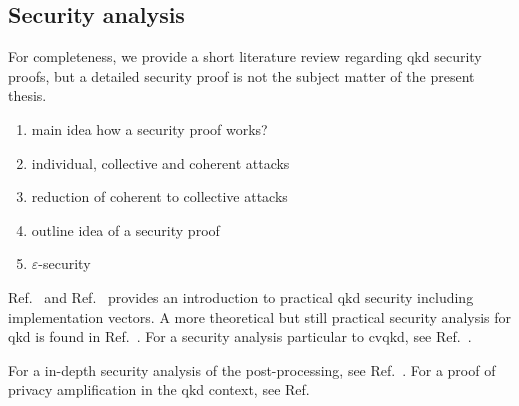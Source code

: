 \FloatBarrier
\subsection{Security analysis}

For completeness, we provide a short literature review regarding \gls{qkd} security proofs, but a detailed security proof is not the subject matter of the present thesis.

\begin{enumerate}
	\item main idea how a security proof works?
	\item individual, collective and coherent attacks
	\item reduction of coherent to collective attacks~\cite{Renner2009}
	\item outline idea of a security proof
	\item $\varepsilon$-security
\end{enumerate}

Ref.~\cite{Lo2014} and Ref.~\cite{Laudenbach2018} provides an introduction to practical \gls{qkd} security including implementation vectors.
A more theoretical but still practical security analysis for \gls{qkd} is found in Ref.~\cite{Scarani2009}.
For a security analysis particular to \gls{cvqkd}, see Ref.~\cite{Diamanti2015}.

For a in-depth security analysis of the post-processing, see Ref.~\cite{Fung2010}.
For a proof of privacy amplification in the \gls{qkd} context, see Ref.~\cite{Renner2005}